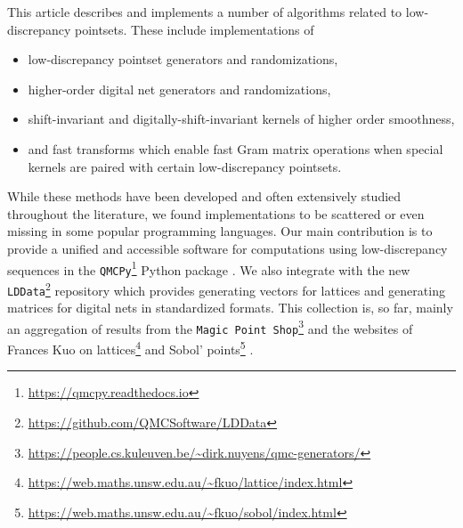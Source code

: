 \documentclass[acmsmall]{acmart}
\begin{document}
This article describes and implements a number of algorithms related to low-discrepancy pointsets. These include implementations of
\begin{itemize}
    \item low-discrepancy pointset generators and randomizations,
    \item higher-order digital net generators and randomizations, 
    \item shift-invariant and digitally-shift-invariant kernels of higher order smoothness,
    \item and fast transforms which enable fast Gram matrix operations when special kernels are paired with certain low-discrepancy pointsets. 
\end{itemize}
While these methods have been developed and often extensively studied throughout the literature, we found implementations to be scattered or even missing in some popular programming languages. Our main contribution is to provide a unified and accessible software for computations using low-discrepancy sequences in the \texttt{QMCPy}\footnote{\url{https://qmcpy.readthedocs.io}} Python package \citep{choi.QMC_software,choi.challenges_great_qmc_software}.  We also integrate with the new \texttt{LDData}\footnote{\url{https://github.com/QMCSoftware/LDData}} repository which provides generating vectors for lattices and generating matrices for digital nets in standardized formats. This collection is, so far, mainly an aggregation of results from the \texttt{Magic Point Shop}\footnote{\url{https://people.cs.kuleuven.be/~dirk.nuyens/qmc-generators/}} \citep{MPS} and the websites of Frances Kuo on lattices\footnote{\url{https://web.maths.unsw.edu.au/~fkuo/lattice/index.html}} \citep{cools2006constructing,nuyens2006fast} and Sobol' points\footnote{\url{https://web.maths.unsw.edu.au/~fkuo/sobol/index.html}} \citep{joe2003remark,joe2008constructing}.
\end{document}
